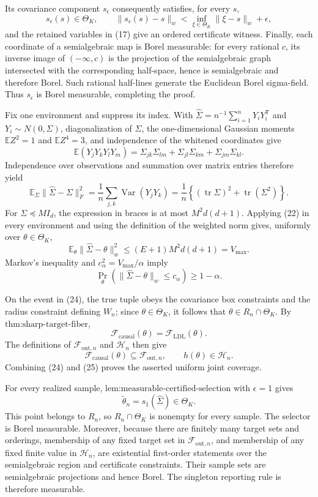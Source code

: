 Its covariance component \(s_\epsilon\) consequently satisfies, for every \(s\),
\[
 s_\epsilon(s)\in\Theta_K,
 \qquad
 \lVert s_\epsilon(s)-s\rVert_w
 <\inf_{\xi\in\Theta_K}\lVert\xi-s\rVert_w+\epsilon, \tag{20}
\]
and the retained variables in (17) give an ordered certificate witness.  Finally, each coordinate of a semialgebraic map is Borel measurable: for every rational \(c\), its inverse image of \(( -\infty,c)\) is the projection of the semialgebraic graph intersected with the corresponding half-space, hence is semialgebraic and therefore Borel.  Such rational half-lines generate the Euclidean Borel sigma-field.  Thus \(s_\epsilon\) is Borel measurable, completing the proof.

Fix one environment and suppress its index.  With \(\widehat\Sigma=n^{-1}\sum_{i=1}^nY_iY_i^{\mathsf T}\) and \(Y_i\sim N(0,\Sigma)\), diagonalization of \(\Sigma\), the one-dimensional Gaussian moments \(\mathbb EZ^2=1\) and \(\mathbb EZ^4=3\), and independence of the whitened coordinates give
\[
 \mathbb E(Y_jY_kY_lY_m)
 =\Sigma_{jk}\Sigma_{lm}+\Sigma_{jl}\Sigma_{km}+\Sigma_{jm}\Sigma_{kl}. \tag{21}
\]
Independence over observations and summation over matrix entries therefore yield
\[
 \mathbb E_\Sigma\lVert\widehat\Sigma-\Sigma\rVert_F^2
 =\frac1n\sum_{j,k}\operatorname{Var}(Y_jY_k)
 =\frac1n\left\{(\operatorname{tr}\Sigma)^2+\operatorname{tr}(\Sigma^2)\right\}. \tag{22}
\]
For \(\Sigma\preceq MI_d\), the expression in braces is at most \(M^2d(d+1)\).  Applying (22) in every environment and using the definition of the weighted norm gives, uniformly over \(\theta\in\Theta_K\),
\[
 \mathbb E_\theta\lVert\widehat\Sigma-\theta\rVert_w^2
 \le (E+1)M^2d(d+1)=V_{\max}. \tag{23}
\]
Markov's inequality and \(c_\alpha^2=V_{\max}/\alpha\) imply
\[
 \Pr_\theta\!\left(\lVert\widehat\Sigma-\theta\rVert_w\le c_\alpha\right)
 \ge1-\alpha. \tag{24}
\]

On the event in (24), the true tuple obeys the covariance box constraints and the radius constraint defining \(W_n\); since \(\theta\in\Theta_K\), it follows that \(\theta\in R_n\cap\Theta_K\).  By \(\text{thm:sharp-target-fiber}\),
\[
 \mathcal F_{\mathrm{causal}}(\theta)=\mathcal F_{\mathrm{LDL}}(\theta).
\]
The definitions of \(\mathcal F_{\mathrm{out},n}\) and \(\mathcal H_n\) then give
\[
 \mathcal F_{\mathrm{causal}}(\theta)\subseteq\mathcal F_{\mathrm{out},n},
 \qquad h(\theta)\in\mathcal H_n. \tag{25}
\]
Combining (24) and (25) proves the asserted uniform joint coverage.

For every realized sample, \(\text{lem:measurable-certified-selection}\) with \(\epsilon=1\) gives
\[
 \widetilde\theta_n=s_1(\widehat\Sigma)\in\Theta_K.
\]
This point belongs to \(R_n\), so \(R_n\cap\Theta_K\) is nonempty for every sample.  The selector is Borel measurable.  Moreover, because there are finitely many target sets and orderings, membership of any fixed target set in \(\mathcal F_{\mathrm{out},n}\), and membership of any fixed finite value in \(\mathcal H_n\), are existential first-order statements over the semialgebraic region and certificate constraints.  Their sample sets are semialgebraic projections and hence Borel.  The singleton reporting rule is therefore measurable.

